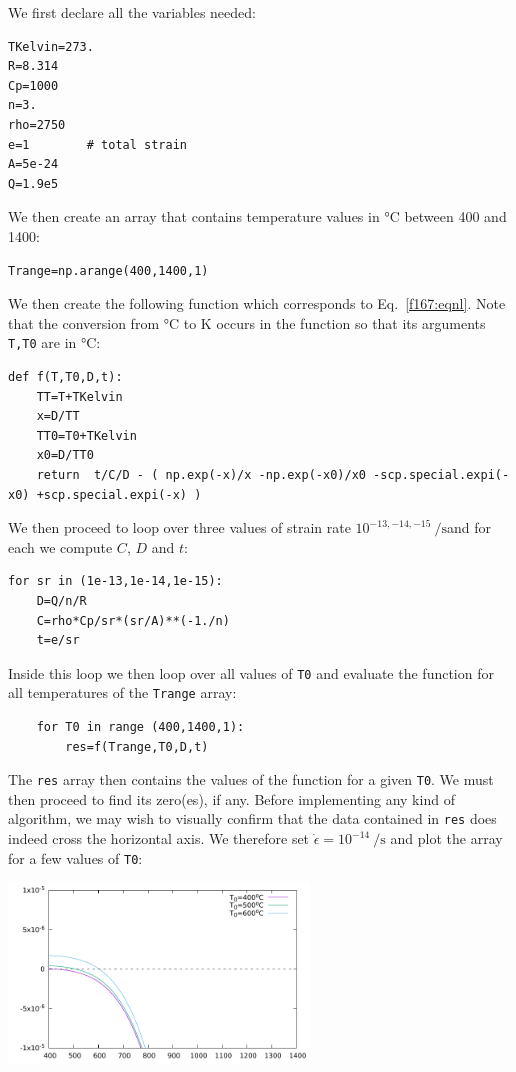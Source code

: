 We first declare all the variables needed:

\begin{lstlisting}
TKelvin=273.
R=8.314
Cp=1000
n=3.
rho=2750
e=1        # total strain
A=5e-24
Q=1.9e5
\end{lstlisting}

We then create an array that contains
temperature values in \si{\celsius} between 400 and 1400:

\begin{lstlisting}
Trange=np.arange(400,1400,1)
\end{lstlisting}

We then create the following function which corresponds to Eq.~\eqref{f167:eqnl}.
Note that the conversion from \si{\celsius} to \si{\kelvin} occurs in the function
so that its arguments \lstinline|T,T0| are in \si{\celsius}:
\begin{lstlisting}
def f(T,T0,D,t):
    TT=T+TKelvin
    x=D/TT
    TT0=T0+TKelvin
    x0=D/TT0
    return  t/C/D - ( np.exp(-x)/x -np.exp(-x0)/x0 -scp.special.expi(-x0) +scp.special.expi(-x) ) 
\end{lstlisting}

We then proceed to loop over three values of strain rate $10^{-13,-14,-15}~\si{\per\second}$and 
for each we compute $C$, $D$ and $t$:

\begin{lstlisting}
for sr in (1e-13,1e-14,1e-15):
    D=Q/n/R
    C=rho*Cp/sr*(sr/A)**(-1./n)
    t=e/sr
\end{lstlisting}

Inside this loop we then loop over all values of \lstinline|T0| and 
evaluate the function for all temperatures of the \lstinline|Trange| array:
\begin{lstlisting}
    for T0 in range (400,1400,1):
        res=f(Trange,T0,D,t)
\end{lstlisting}

The \lstinline|res| array then contains the values of the function for a given \lstinline|T0|.
We must then proceed to find its zero(es), if any. 
Before implementing any kind of algorithm, we may wish to visually confirm 
that the data contained in \lstinline|res| does indeed cross the horizontal axis. 
We therefore set $\dot\epsilon=10^{-14}~\si{\per\second}$ and plot the array 
for a few values of \lstinline|T0|:

\begin{center}
\includegraphics[width=8cm]{python_codes/fieldstone_167/lines/res.pdf}
\end{center}

